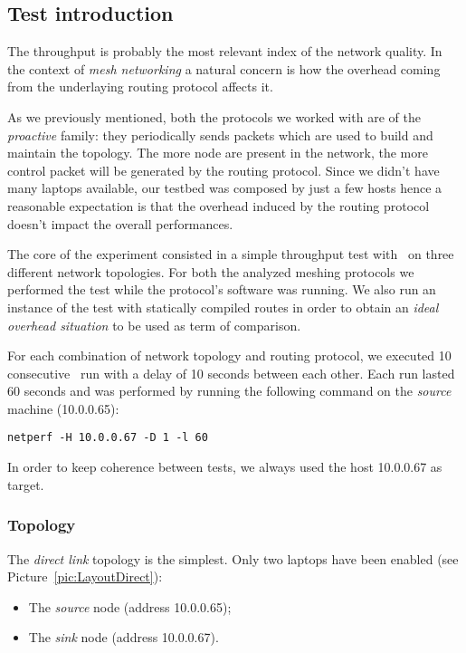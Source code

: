 \subsection{Test introduction}

    The throughput is probably the most relevant index of the network
    quality. In the context of \emph{mesh networking} a natural concern
    is how the overhead coming from the underlaying routing protocol
    affects it.

    As we previously mentioned, both the protocols we worked
    with are of the \emph{proactive} family: they periodically sends
    packets which are used to build and maintain the topology. The
    more node are present in the network, the more control packet will
    be generated by the routing protocol.
    Since we didn't have many laptops available, our testbed was composed
    by just a few hosts hence a reasonable expectation is that the overhead
    induced by the routing protocol doesn't impact the overall
    performances.

    The core of the experiment consisted in a simple throughput test with
    \netperf\ on three different network topologies. For both the
    analyzed meshing protocols we performed the test while the protocol's
    software was running. We also run an instance of the test with
    statically compiled routes in order to obtain an \emph{ideal overhead
    situation} to be used as term of comparison.

    For each combination of network topology and routing protocol, we
    executed 10 consecutive \netperf\ run with a delay of 10 seconds
    between each other. Each run lasted 60 seconds and was performed by
    running the following command on the \emph{source} machine (10.0.0.65):
\begin{verbatim}
netperf -H 10.0.0.67 -D 1 -l 60
\end{verbatim}

    In order to keep coherence between tests, we always used the host
    10.0.0.67 as target.

    \subsubsection{Topology}

        The \emph{direct link} topology is the simplest. Only two laptops
        have been enabled (see Picture~\ref{pic:LayoutDirect}):
        \begin{itemize}
        \item   The \emph{source} node (address 10.0.0.65);
        \item   The \emph{sink} node (address 10.0.0.67).
        \end{itemize}

